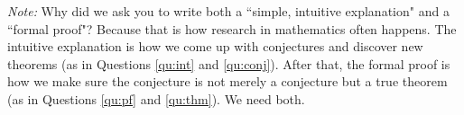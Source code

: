 \documentclass[12pt]{exam}
\begin{document}
\begin{enumerate}
\emph{Note:}  Why did we ask you to write both a ``simple, intuitive explanation" and a ``formal proof"?  Because that is how research in mathematics often happens.  The intuitive explanation is how we come up with conjectures and discover new theorems (as in Questions \ref{qu:int} and \ref{qu:conj}).   After that, the formal proof is how we make sure the conjecture is not merely a conjecture but a true theorem (as in Questions \ref{qu:pf} and \ref{qu:thm}).   We need both.

\end{enumerate}
\end{document}
